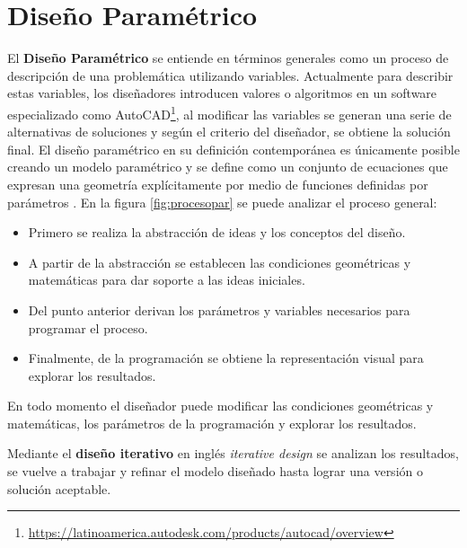 \section{Diseño Paramétrico}
\label{cadparam}
El \textbf{Diseño Paramétrico} se entiende en términos generales como un proceso de descripción de una problemática utilizando variables. Actualmente para describir estas variables, los diseñadores introducen valores o algoritmos en un software especializado como \Gls{AutoCAD}\footnote{\url{https://latinoamerica.autodesk.com/products/autocad/overview}}, al modificar las variables se generan una serie de alternativas de soluciones y según el criterio del diseñador, se obtiene la solución final. El diseño paramétrico en su definición contemporánea es únicamente posible creando un modelo paramétrico y se define como un conjunto de ecuaciones que expresan una geometría explícitamente por medio de funciones definidas por parámetros \citep{burry2012new}. En la figura \ref{fig:procesopar} \citep{bohnacker2012generative} se puede analizar el proceso general:

\begin{itemize}
    \item Primero se realiza la abstracción de ideas y los conceptos del diseño. 
    \item A partir de la abstracción se establecen las condiciones geométricas y matemáticas para dar soporte a las ideas iniciales.
    \item Del punto anterior derivan los parámetros y variables necesarios para programar el proceso. 
    \item Finalmente, de la programación se obtiene la representación visual para explorar los resultados. 
\end{itemize}

En todo momento el diseñador puede modificar las condiciones geométricas y matemáticas, los parámetros de la programación y explorar los resultados.

\newline
Mediante el \textbf{diseño iterativo} en inglés \textit{iterative design} \citep{blokdyk2018iterative} se analizan los resultados, se vuelve a trabajar y refinar el modelo diseñado hasta lograr una versión o solución aceptable. 


